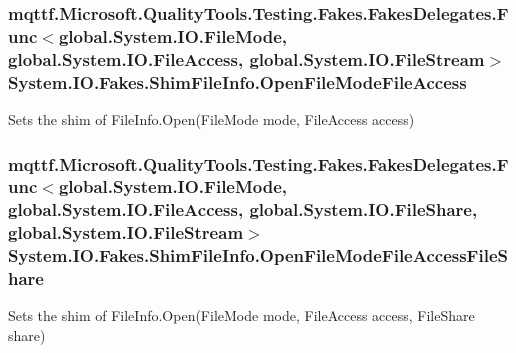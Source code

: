 \hypertarget{class_system_1_1_i_o_1_1_fakes_1_1_shim_file_info_a2127ecf29bb2f3e1d4bf777bb22c3060}{
\subsubsection[{Open\-File\-Mode\-File\-Access}]{\setlength{\rightskip}{0pt plus 5cm}mqttf.\-Microsoft.\-Quality\-Tools.\-Testing.\-Fakes.\-Fakes\-Delegates.\-Func$<$global.\-System.\-I\-O.\-File\-Mode, global.\-System.\-I\-O.\-File\-Access, global.\-System.\-I\-O.\-File\-Stream$>$ System.\-I\-O.\-Fakes.\-Shim\-File\-Info.\-Open\-File\-Mode\-File\-Access\hspace{0.3cm}{\ttfamily [set]}}}\label{class_system_1_1_i_o_1_1_fakes_1_1_shim_file_info_a2127ecf29bb2f3e1d4bf777bb22c3060}


Sets the shim of File\-Info.\-Open(\-File\-Mode mode, File\-Access access)

\hypertarget{class_system_1_1_i_o_1_1_fakes_1_1_shim_file_info_a1355583744570cfd191495cf2a66868f}{
\subsubsection[{Open\-File\-Mode\-File\-Access\-File\-Share}]{\setlength{\rightskip}{0pt plus 5cm}mqttf.\-Microsoft.\-Quality\-Tools.\-Testing.\-Fakes.\-Fakes\-Delegates.\-Func$<$global.\-System.\-I\-O.\-File\-Mode, global.\-System.\-I\-O.\-File\-Access, global.\-System.\-I\-O.\-File\-Share, global.\-System.\-I\-O.\-File\-Stream$>$ System.\-I\-O.\-Fakes.\-Shim\-File\-Info.\-Open\-File\-Mode\-File\-Access\-File\-Share\hspace{0.3cm}{\ttfamily [set]}}}\label{class_system_1_1_i_o_1_1_fakes_1_1_shim_file_info_a1355583744570cfd191495cf2a66868f}


Sets the shim of File\-Info.\-Open(\-File\-Mode mode, File\-Access access, File\-Share share)

